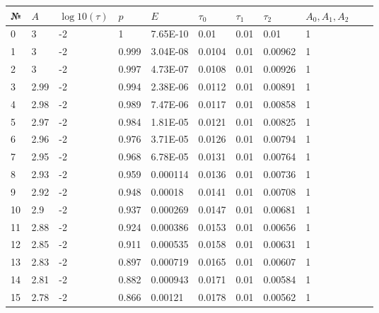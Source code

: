 \begin{table}[ht]
	\begin{tabular}{|l|l|l|l|l|l|l|l|l|l|l|}
        \hline
		№  & $A$  & $\log10(\tau)$ & $p$   & $E$      & $\tau_0$ & $\tau_1$ & $\tau_2$ & $A_0, A_1, A_2$\\ \hline
		0  & 3    & -2             & 1     & 7.65E-10 & 0.01     & 0.01     & 0.01     & 1              \\ \hline
		1  & 3    & -2             & 0.999 & 3.04E-08 & 0.0104   & 0.01     & 0.00962  & 1              \\ \hline
		2  & 3    & -2             & 0.997 & 4.73E-07 & 0.0108   & 0.01     & 0.00926  & 1              \\ \hline
		3  & 2.99 & -2             & 0.994 & 2.38E-06 & 0.0112   & 0.01     & 0.00891  & 1              \\ \hline
		4  & 2.98 & -2             & 0.989 & 7.47E-06 & 0.0117   & 0.01     & 0.00858  & 1              \\ \hline
		5  & 2.97 & -2             & 0.984 & 1.81E-05 & 0.0121   & 0.01     & 0.00825  & 1              \\ \hline
		6  & 2.96 & -2             & 0.976 & 3.71E-05 & 0.0126   & 0.01     & 0.00794  & 1              \\ \hline
		7  & 2.95 & -2             & 0.968 & 6.78E-05 & 0.0131   & 0.01     & 0.00764  & 1              \\ \hline
		8  & 2.93 & -2             & 0.959 & 0.000114 & 0.0136   & 0.01     & 0.00736  & 1              \\ \hline
		9  & 2.92 & -2             & 0.948 & 0.00018  & 0.0141   & 0.01     & 0.00708  & 1              \\ \hline
		10 & 2.9  & -2             & 0.937 & 0.000269 & 0.0147   & 0.01     & 0.00681  & 1              \\ \hline
		11 & 2.88 & -2             & 0.924 & 0.000386 & 0.0153   & 0.01     & 0.00656  & 1              \\ \hline
		12 & 2.85 & -2             & 0.911 & 0.000535 & 0.0158   & 0.01     & 0.00631  & 1              \\ \hline
		13 & 2.83 & -2             & 0.897 & 0.000719 & 0.0165   & 0.01     & 0.00607  & 1              \\ \hline
		14 & 2.81 & -2             & 0.882 & 0.000943 & 0.0171   & 0.01     & 0.00584  & 1              \\ \hline
		15 & 2.78 & -2             & 0.866 & 0.00121  & 0.0178   & 0.01     & 0.00562  & 1              \\ \hline

\end{tabular}
\end{table}
